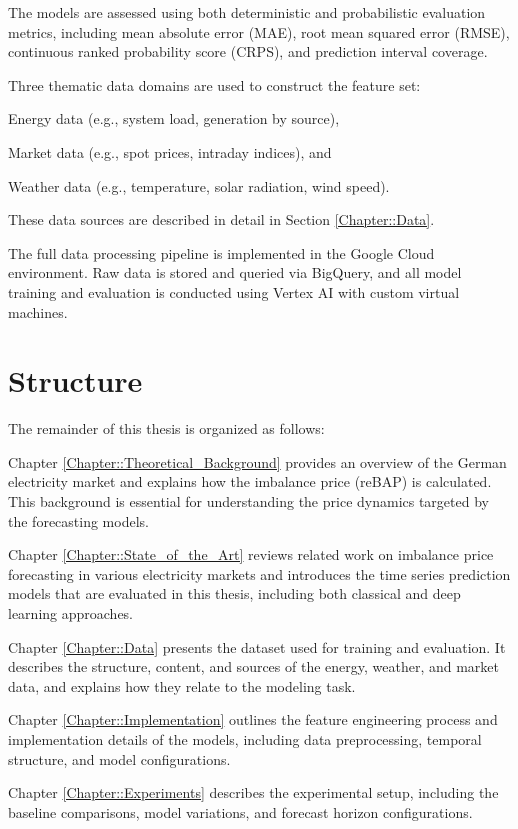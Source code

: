 \documentclass[class=scrbook, crop=false]{standalone}
\begin{document}
The models are assessed using both deterministic and probabilistic evaluation metrics, including mean absolute error (MAE), root mean squared error (RMSE), continuous ranked probability score (CRPS), and prediction interval coverage.

Three thematic data domains are used to construct the feature set:

Energy data (e.g., system load, generation by source),

Market data (e.g., spot prices, intraday indices), and

Weather data (e.g., temperature, solar radiation, wind speed).

These data sources are described in detail in Section \ref{Chapter::Data}.

The full data processing pipeline is implemented in the Google Cloud environment. Raw data is stored and queried via BigQuery, and all model training and evaluation is conducted using Vertex AI with custom virtual machines.

\section{Structure}
\label{Section::Structure}
The remainder of this thesis is organized as follows:

Chapter \ref{Chapter::Theoretical_Background} provides an overview of the German electricity market and explains how the imbalance price (reBAP) is calculated. This background is essential for understanding the price dynamics targeted by the forecasting models.

Chapter \ref{Chapter::State_of_the_Art} reviews related work on imbalance price forecasting in various electricity markets and introduces the time series prediction models that are evaluated in this thesis, including both classical and deep learning approaches.

Chapter  \ref{Chapter::Data} presents the dataset used for training and evaluation. It describes the structure, content, and sources of the energy, weather, and market data, and explains how they relate to the modeling task.

Chapter  \ref{Chapter::Implementation} outlines the feature engineering process and implementation details of the models, including data preprocessing, temporal structure, and model configurations.

Chapter \ref{Chapter::Experiments}  describes the experimental setup, including the baseline comparisons, model variations, and forecast horizon configurations.
\end{document}
